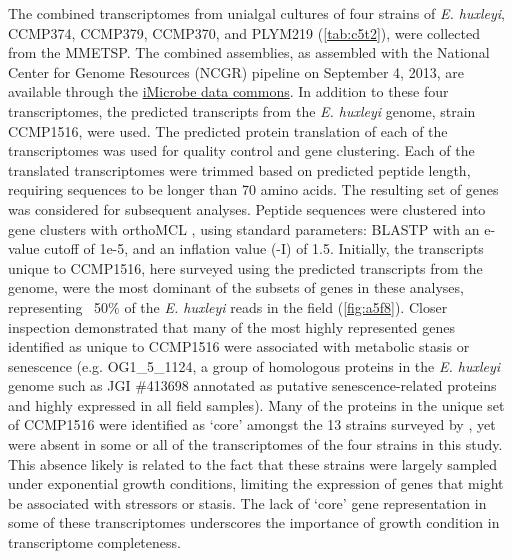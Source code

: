 The combined transcriptomes from unialgal cultures of four strains of \textit{E. huxleyi}, CCMP374, CCMP379, CCMP370, and PLYM219 (\cref{tab:c5t2}), were collected from the MMETSP. The combined assemblies, as assembled with the National Center for Genome Resources (NCGR) pipeline on September 4, 2013, are available through the \href{http://data.imicrobe.us/project/view/104#combined-assemblies}{iMicrobe data commons}. In addition to these four transcriptomes, the predicted transcripts from the \textit{E. huxleyi} genome, strain CCMP1516, were used. The predicted protein translation of each of the transcriptomes was used for quality control and gene clustering. Each of the translated transcriptomes were trimmed based on predicted peptide length, requiring sequences to be longer than 70 amino acids. The resulting set of genes was considered for subsequent analyses. Peptide sequences were clustered into gene clusters with orthoMCL \citep{Li2003}, using standard parameters: BLASTP with an e-value cutoff of 1e-5, and an inflation value (-I) of 1.5. Initially, the transcripts unique to CCMP1516, here surveyed using the predicted transcripts from the genome, were the most dominant of the subsets of genes in these analyses, representing ~50\% of the \textit{E. huxleyi} reads in the field (\cref{fig:a5f8}). Closer inspection demonstrated that many of the most highly represented genes identified as unique to CCMP1516 were associated with metabolic stasis or senescence (e.g. OG1\_5\_1124, a group of homologous proteins in the \textit{E. huxleyi} genome such as JGI \#413698 annotated as putative senescence-related proteins and highly expressed in all field samples). Many of the proteins in the unique set of CCMP1516 were identified as `core' amongst the 13 strains surveyed by \citet{Read2013}, yet were absent in some or all of the transcriptomes of the four strains in this study. This absence likely is related to the fact that these strains were largely sampled under exponential growth conditions, limiting the expression of genes that might be associated with stressors or stasis. The lack of `core' gene representation in some of these transcriptomes underscores the importance of growth condition in transcriptome completeness.\par

